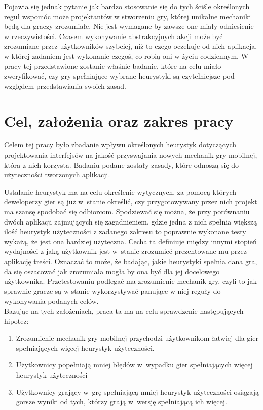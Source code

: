 \documentclass[a4paper,12pt,numbers=noenddot]{report}
\begin{document}
Pojawia się jednak pytanie jak bardzo stosowanie się do tych ściśle określonych reguł wspomóc może projektantów w stworzeniu gry, której unikalne mechaniki będą dla graczy zrozumiałe. Nie jest wymagane by zawsze one miały odniesienie w rzeczywistości. Czasem wykonywanie abstrakcyjnych akcji może być zrozumiane przez użytkowników szybciej, niż to czego oczekuje od nich aplikacja, w której zadaniem jest wykonanie czegoś, co robią oni w życiu codziennym. W pracy tej przedstawione zostanie właśnie badanie, które na celu miało zweryfikować, czy gry spełniające wybrane heurystyki są czytelniejsze pod względem przedstawiania swoich zasad. 

\chapter{Cel, założenia oraz zakres pracy}
Celem tej pracy było zbadanie wpływu określonych heurystyk dotyczących projektowania interfejsów na jakość przyswajania nowych mechanik gry mobilnej, która z nich korzysta. Badaniu podane zostały zasady, które odnoszą się do użyteczności tworzonych aplikacji.

Ustalanie heurystyk ma na celu określenie wytycznych, za pomocą których deweloperzy gier są już w~stanie określić, czy przygotowywany przez nich projekt ma szansę spodobać się odbiorcom. Spodziewać się można, że przy porównaniu dwóch aplikacji zajmujących się zagadnieniem, gdzie jedna z nich spełnia większą ilość heurystyk użyteczności z zadanego zakresu to poprawnie wykonane testy wykażą, że jest ona bardziej użyteczna. Cecha ta definiuje między innymi stopień wydajności z jaką użytkownik jest w~stanie zrozumieć prezentowane mu przez aplikację treści. Oznaczać to może, że badając, jakie heurystyki spełnia dana gra, da się oszacować jak zrozumiała mogła by ona być dla jej docelowego użytkownika. Przetestowaniu podlegać ma zrozumienie mechanik gry, czyli to jak sprawnie gracze są w stanie wykorzystywać panujące w niej reguły do wykonywania podanych celów.\\
Bazując na tych założeniach, praca ta ma na celu sprawdzenie następujących hipotez:

\begin{enumerate}
\item Zrozumienie mechanik gry mobilnej przychodzi użytkownikom łatwiej dla gier spełniających więcej heurystyk użyteczności.
\item Użytkownicy popełniają mniej błędów w~wypadku gier spełniających więcej heurystyk użyteczności
\item Użytkownicy grający w~grę spełniającą mniej heurystyk użyteczności osiągają gorsze wyniki od tych, którzy grają w~wersję spełniającą ich więcej.
\end{enumerate}
\end{document}
